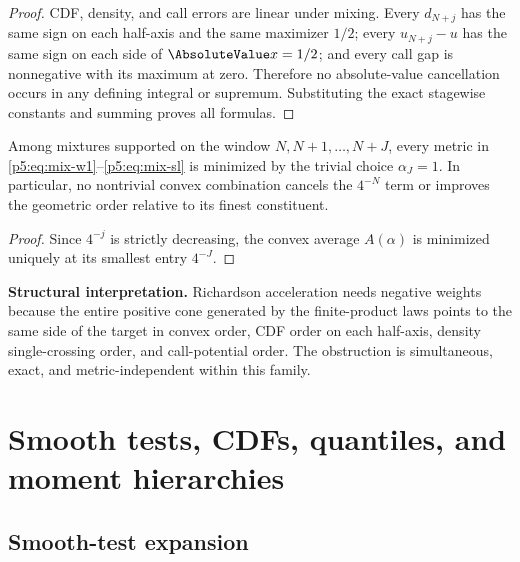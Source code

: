 \documentclass[11pt,oneside]{article}
\numberwithin{equation}{section}
\theoremstyle{definition}
\theoremstyle{remark}
\begin{document}
\begin{proof}
CDF, density, and call errors are linear under mixing.  Every $d_{N+j}$ has the same sign on each half-axis and the same maximizer $1/2$; every $u_{N+j}-u$ has the same sign on each side of $\AbsoluteValue x=1/2$; and every call gap is nonnegative with its maximum at zero.  Therefore no absolute-value cancellation occurs in any defining integral or supremum.  Substituting the exact stagewise constants and summing proves all formulas.
\end{proof}

\begin{corollary}
Among mixtures supported on the window $N,N+1,\ldots,N+J$, every metric in \eqref{p5:eq:mix-w1}--\eqref{p5:eq:mix-sl} is minimized by the trivial choice $\alpha_J=1$.  In particular, no nontrivial convex combination cancels the $4^{-N}$ term or improves the geometric order relative to its finest constituent.
\end{corollary}

\begin{proof}
Since $4^{-j}$ is strictly decreasing, the convex average $A(\alpha)$ is minimized uniquely at its smallest entry $4^{-J}$.
\end{proof}

\begin{boxedremark}
\textbf{Structural interpretation.}  Richardson acceleration needs negative weights because the entire positive cone generated by the finite-product laws points to the same side of the target in convex order, CDF order on each half-axis, density single-crossing order, and call-potential order.  The obstruction is simultaneous, exact, and metric-independent within this family.
\end{boxedremark}

\section{Smooth tests, CDFs, quantiles, and moment hierarchies}
\label{p5:sec:smooth}

\subsection{Smooth-test expansion}
\end{document}
